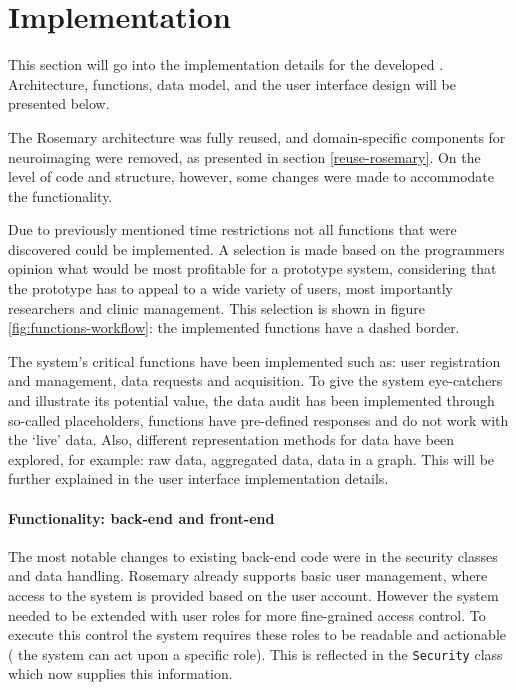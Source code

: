 \section{\ivfsystem{} Implementation}

This section will go into the implementation details for the developed \ivfsystem{}.
Architecture, functions, data model, and the user interface design will be presented below.

The Rosemary architecture was fully reused, and domain-specific components for neuroimaging were removed, 
 as presented in section \ref{reuse-rosemary}. 
On the level of code and structure, however, some changes were made to accommodate the \ivfsystem{} functionality.

Due to previously mentioned time restrictions not all functions that were discovered could be implemented.
A selection is made based on the programmers opinion what would be most profitable for a prototype system, considering that the prototype has to appeal to a wide variety of users, most importantly researchers and clinic management.
This selection is shown in figure \ref{fig:functions-workflow}: the implemented functions have a dashed border.

The system's critical functions have been implemented such as: user registration and management, data requests and acquisition.
To give the system eye-catchers and illustrate its potential value, the data audit has been implemented through so-called placeholders, \ie{} functions have pre-defined responses and do not work with the `live' data.
Also, different representation methods for data have been explored, for example: raw data, aggregated data, data in a graph.
This will be further explained in the user interface implementation details.

\paragraph{Functionality: back-end and front-end}
The most notable changes to existing back-end code were in the security classes and data handling.
Rosemary already supports basic user management, where access to the system is provided based on the user account.
However the system needed to be extended with user roles for more fine-grained access control.
To execute this control the system requires these roles to be readable and actionable (\ie{} the system can act upon a specific role). 
This is reflected in the {\tt Security} class which now supplies this information.

